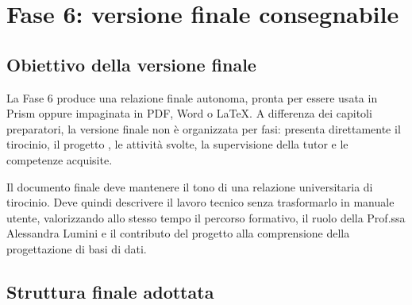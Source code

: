 
\chapter{Fase 6: versione finale consegnabile}

\section{Obiettivo della versione finale}

La Fase 6 produce una relazione finale autonoma, pronta per essere usata in Prism oppure impaginata in PDF, Word o LaTeX. A differenza dei capitoli preparatori, la versione finale non è organizzata per fasi: presenta direttamente il tirocinio, il progetto \builder, le attività svolte, la supervisione della tutor e le competenze acquisite.

Il documento finale deve mantenere il tono di una relazione universitaria di tirocinio. Deve quindi descrivere il lavoro tecnico senza trasformarlo in manuale utente, valorizzando allo stesso tempo il percorso formativo, il ruolo della Prof.ssa Alessandra Lumini e il contributo del progetto alla comprensione della progettazione di basi di dati.

\section{Struttura finale adottata}

